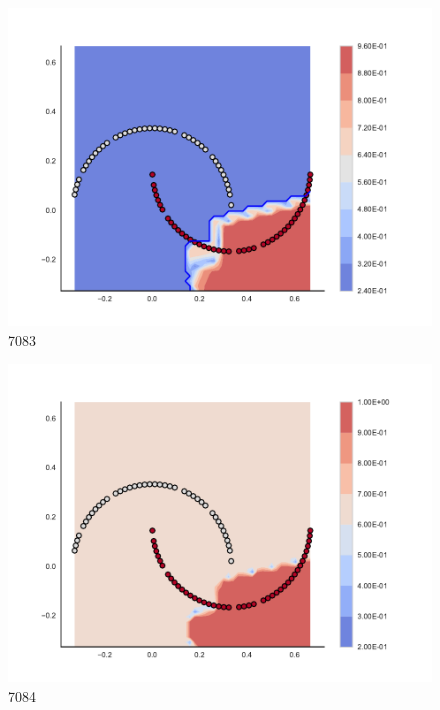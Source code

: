 \begin{subfigure}[b]{0.09\textwidth}
    \includegraphics[clip, trim=2.35cm 1.75cm 4.5cm 0cm,width=\textwidth]{img/convergence/7083.pdf}
    \caption{7083}
    \label{fig:convergence_7083}
\end{subfigure}
%
\begin{subfigure}[b]{0.09\textwidth}
    \includegraphics[clip, trim=2.35cm 1.75cm 4.5cm 0cm,width=\textwidth]{img/convergence/7084.pdf}
    \caption{7084}
    \label{fig:convergence_7084}
\end{subfigure}
%
